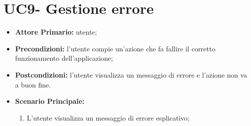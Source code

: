 \section{UC9- Gestione errore}
\begin{itemize}
  \item \textbf{Attore Primario:} utente;
  \item \textbf{Precondizioni:} l'utente compie un'azione che fa fallire il corretto funzionamento dell'applicazione;
  \item \textbf{Postcondizioni:} l'utente visualizza un messaggio di errore e l'azione non va a buon fine.
  \item \textbf{Scenario Principale:}
  \begin{enumerate}
    \item L'utente visualizza un messaggio di errore esplicativo;
  \end{enumerate}
\end{itemize}
